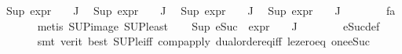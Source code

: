 \begin{isabellebody}
{\isachardoublequoteopen}Sup\ {\isacharparenleft}{\kern0pt}{\isacharparenleft}{\kern0pt}expr{\isacharunderscore}{\kern0pt}{}\ {\isasymcirc}\ {\isasymPhi}{\isacharparenright}{\kern0pt}\ {\isacharbackquote}{\kern0pt}\ J{\isacharparenright}{\kern0pt}\ {\isasymle}\ {}{\isachardoublequoteclose}\isanewline
{\isachardoublequoteopen}Sup\ {\isacharparenleft}{\kern0pt}{\isacharparenleft}{\kern0pt}expr{\isacharunderscore}{\kern0pt}{}\ {\isasymcirc}\ {\isasymPhi}{\isacharparenright}{\kern0pt}\ {\isacharbackquote}{\kern0pt}\ J{\isacharparenright}{\kern0pt}\ {\isasymle}\ {}{\isachardoublequoteclose}\isanewline
{\isachardoublequoteopen}Sup\ {\isacharparenleft}{\kern0pt}{\isacharparenleft}{\kern0pt}expr{\isacharunderscore}{\kern0pt}{}\ {\isasymcirc}\ {\isasymPhi}{\isacharparenright}{\kern0pt}\ {\isacharbackquote}{\kern0pt}\ J{\isacharparenright}{\kern0pt}\ {\isasymle}\ {}{\isachardoublequoteclose}\isanewline
{\isachardoublequoteopen}Sup\ {\isacharparenleft}{\kern0pt}{\isacharparenleft}{\kern0pt}expr{\isacharunderscore}{\kern0pt}{}\ {\isasymcirc}\ {\isasymPhi}{\isacharparenright}{\kern0pt}\ {\isacharbackquote}{\kern0pt}\ J{\isacharparenright}{\kern0pt}\ {\isasymle}\ {}{\isachardoublequoteclose}\isanewline
\ \ \ \ \isamarkupfalse%
\ fa{\isacharunderscore}{\kern0pt}{\isasympsi}\ \isanewline
\ \ \ \ \isamarkupfalse%
\ {\isacharparenleft}{\kern0pt}metis\ SUP{\isacharunderscore}{\kern0pt}image\ SUP{\isacharunderscore}{\kern0pt}least{\isacharparenright}{\kern0pt}{\isacharplus}{\kern0pt}\isanewline
\ \ \isamarkupfalse%
\ {\isachardoublequoteopen}Sup\ {\isacharparenleft}{\kern0pt}{\isacharparenleft}{\kern0pt}eSuc\ {\isasymcirc}\ expr{\isacharunderscore}{\kern0pt}{}\ {\isasymcirc}\ {\isasymPhi}{\isacharparenright}{\kern0pt}\ {\isacharbackquote}{\kern0pt}\ J{\isacharparenright}{\kern0pt}\ {\isasymle}\ {}{\isachardoublequoteclose}\isanewline
\ \ \ \ \isamarkupfalse%
\ eSuc{\isacharunderscore}{\kern0pt}def\ \isanewline
\ \ \ \ \isamarkupfalse%
\ {\isacharparenleft}{\kern0pt}smt\ {\isacharparenleft}{\kern0pt}verit{\isacharcomma}{\kern0pt}\ best{\isacharparenright}{\kern0pt}\ SUP{\isacharunderscore}{\kern0pt}le{\isacharunderscore}{\kern0pt}iff\ comp{\isacharunderscore}{\kern0pt}apply\ dual{\isacharunderscore}{\kern0pt}order{\isachardot}{\kern0pt}eq{\isacharunderscore}{\kern0pt}iff\ le{\isacharunderscore}{\kern0pt}zero{\isacharunderscore}{\kern0pt}eq\ one{\isacharunderscore}{\kern0pt}eSuc{\isacharparenright}{\kern0pt}\isanewline

\end{isabellebody}
